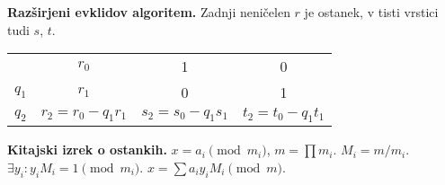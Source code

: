 \documentclass[a4paper, oneside, 10pt]{article}
\theoremstyle{definition}
\begin{document}
\textbf{Razširjeni evklidov algoritem.} Zadnji neničelen $r$ je ostanek, v tisti vrstici tudi
$s$, $t$. \\
\begin{tabular}[h]{c|c|c|c}
        & $r_0$ & 1 & 0 \\
  $q_1$ & $r_1$ & 0 & 1 \\ \hline
  $q_2$ & $r_2 = r_0 - q_1r_1$ & $s_2 = s_0-q_1s_1$ & $t_2 = t_0 - q_1t_1$ \\
\end{tabular}

\textbf{Kitajski izrek o ostankih.} $x = a_i \pmod{m_i}$, $m = \prod m_i$. $M_i = m/m_i$. $\exists
y_i: y_iM_i = 1 \pmod{m_i}$. $x = \sum a_iy_iM_i \pmod{m}$.
\end{document}
